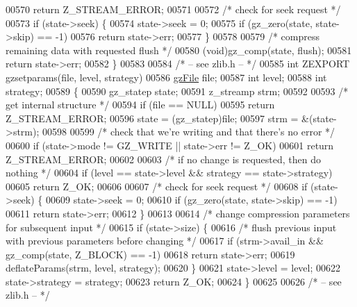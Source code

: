 \begin{DoxyCode}
00570         \textcolor{keywordflow}{return} Z\_STREAM\_ERROR;
00571 
00572     \textcolor{comment}{/* check for seek request */}
00573     \textcolor{keywordflow}{if} (state->seek) \{
00574         state->seek = 0;
00575         \textcolor{keywordflow}{if} (gz\_zero(state, state->skip) == -1)
00576             \textcolor{keywordflow}{return} state->err;
00577     \}
00578 
00579     \textcolor{comment}{/* compress remaining data with requested flush */}
00580     (void)gz\_comp(state, flush);
00581     \textcolor{keywordflow}{return} state->err;
00582 \}
00583 
00584 \textcolor{comment}{/* -- see zlib.h -- */}
00585 \textcolor{keywordtype}{int} ZEXPORT gzsetparams(file, level, strategy)
00586     \hyperlink{structgz_file__s}{gzFile} file;
00587     \textcolor{keywordtype}{int} level;
00588     \textcolor{keywordtype}{int} strategy;
00589 \{
00590     gz\_statep state;
00591     z\_streamp strm;
00592 
00593     \textcolor{comment}{/* get internal structure */}
00594     \textcolor{keywordflow}{if} (file == NULL)
00595         \textcolor{keywordflow}{return} Z\_STREAM\_ERROR;
00596     state = (gz\_statep)file;
00597     strm = &(state->strm);
00598 
00599     \textcolor{comment}{/* check that we're writing and that there's no error */}
00600     \textcolor{keywordflow}{if} (state->mode != GZ\_WRITE || state->err != Z\_OK)
00601         \textcolor{keywordflow}{return} Z\_STREAM\_ERROR;
00602 
00603     \textcolor{comment}{/* if no change is requested, then do nothing */}
00604     \textcolor{keywordflow}{if} (level == state->level && strategy == state->strategy)
00605         \textcolor{keywordflow}{return} Z\_OK;
00606 
00607     \textcolor{comment}{/* check for seek request */}
00608     \textcolor{keywordflow}{if} (state->seek) \{
00609         state->seek = 0;
00610         \textcolor{keywordflow}{if} (gz\_zero(state, state->skip) == -1)
00611             \textcolor{keywordflow}{return} state->err;
00612     \}
00613 
00614     \textcolor{comment}{/* change compression parameters for subsequent input */}
00615     \textcolor{keywordflow}{if} (state->size) \{
00616         \textcolor{comment}{/* flush previous input with previous parameters before changing */}
00617         \textcolor{keywordflow}{if} (strm->avail\_in && gz\_comp(state, Z\_BLOCK) == -1)
00618             \textcolor{keywordflow}{return} state->err;
00619         deflateParams(strm, level, strategy);
00620     \}
00621     state->level = level;
00622     state->strategy = strategy;
00623     \textcolor{keywordflow}{return} Z\_OK;
00624 \}
00625 
00626 \textcolor{comment}{/* -- see zlib.h -- */}

\end{DoxyCode}
